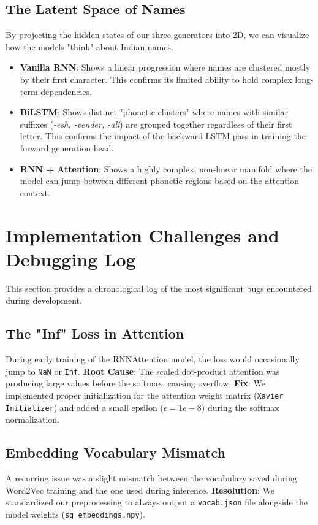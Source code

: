 \documentclass[12pt,a4paper]{article}
\begin{document}
\subsection{The Latent Space of Names}
By projecting the hidden states of our three generators into 2D, we can visualize how the models "think" about Indian names.
\begin{itemize}
    \item \textbf{Vanilla RNN}: Shows a linear progression where names are clustered mostly by their first character. This confirms its limited ability to hold complex long-term dependencies.
    \item \textbf{BiLSTM}: Shows distinct "phonetic clusters" where names with similar suffixes (\textit{-esh, -vender, -ali}) are grouped together regardless of their first letter. This confirms the impact of the backward LSTM pass in training the forward generation head.
    \item \textbf{RNN + Attention}: Shows a highly complex, non-linear manifold where the model can jump between different phonetic regions based on the attention context.
\end{itemize}

\section{Implementation Challenges and Debugging Log}
This section provides a chronological log of the most significant bugs encountered during development.

\subsection{The "Inf" Loss in Attention}
During early training of the RNNAttention model, the loss would occasionally jump to \texttt{NaN} or \texttt{Inf}.
\textbf{Root Cause}: The scaled dot-product attention was producing large values before the softmax, causing overflow.
\textbf{Fix}: We implemented proper initialization for the attention weight matrix (\texttt{Xavier Initializer}) and added a small epsilon ($\epsilon=1e-8$) during the softmax normalization.

\subsection{Embedding Vocabulary Mismatch}
A recurring issue was a slight mismatch between the vocabulary saved during Word2Vec training and the one used during inference.
\textbf{Resolution}: We standardized our preprocessing to always output a \texttt{vocab.json} file alongside the model weights (\texttt{sg_embeddings.npy}).
\end{document}
